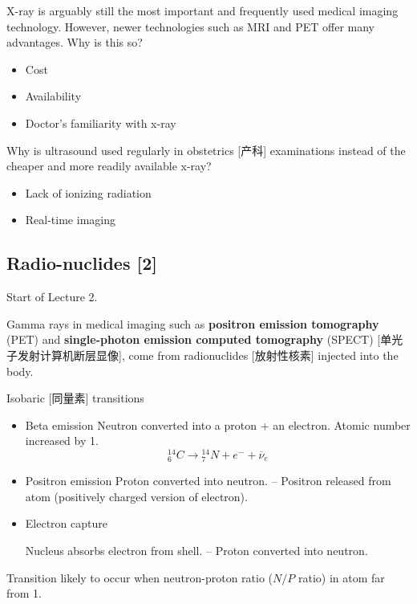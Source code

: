\documentclass[UTF8,a4paper,11pt]{book}
\theoremstyle{mystyle}{
  \newtheorem{example}{Example}
}
\begin{document}
\begin{example}
 X-ray is arguably still the most important and
frequently used medical imaging technology.
However, newer technologies such as MRI and
PET offer many advantages. Why is this so?
\begin{itemize}
\item Cost
\item Availability
\item Doctor's familiarity with x-ray
\end{itemize}

\end{example}

\begin{example}
Why is ultrasound used regularly in obstetrics [产科]
examinations instead of the cheaper and more
readily available x-ray?
\begin{itemize}
\item Lack of ionizing radiation
\item Real-time imaging
\end{itemize}
\end{example}



\subsection{Radio-nuclides [2]}
{\sf Start of Lecture 2.}

Gamma rays in medical imaging such as 
\textbf{positron emission tomography} (PET)
and \textbf{single-photon emission computed
tomography} (SPECT) [单光子发射计算机断层显像], 
come from
radionuclides [放射性核素] injected into the body.

Isobaric [同量素] transitions

\begin{itemize}
\item  Beta emission
 Neutron converted into a proton + an electron.
 Atomic number increased by 1.
\[ 
{}_6^{14} C \to {}_7^{14} N + e^{-} + \overline{\nu}_e
 \]
\item  Positron emission
Proton converted into neutron.
– Positron released from atom (positively charged
version of electron).

\item  Electron capture

 Nucleus absorbs electron from shell.
– Proton converted into neutron.

\end{itemize}
Transition likely to occur when neutron-proton
ratio ($N/P$ ratio) in atom far from 1.
\end{document}
